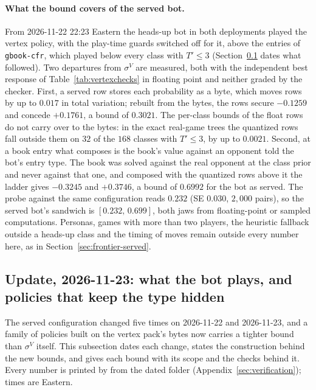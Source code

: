 \documentclass[11pt]{article}
\theoremstyle{plain}
\theoremstyle{definition}
\theoremstyle{remark}
\newcommand{\code}[1]{\texttt{\small #1}}
\begin{document}
\paragraph{What the bound covers of the served bot.} From 2026-11-22
22:23 Eastern the heads-up bot in both deployments played the vertex
policy, with the play-time guards switched off for it, above the
entries of \code{gbook-cfr}, which played below every class with
$T'\le3$ (Section~\ref{sec:split} dates what followed).
Two departures from $\sigma^{V}$ are measured, both with the
independent best response of Table~\ref{tab:vertexchecks} in floating
point and neither graded by the checker. First, a served row stores
each probability as a byte, which moves rows by up to $0.017$ in total
variation; rebuilt from the bytes, the rows secure $-0.1259$ and
concede $+0.1761$, a bound of $0.3021$. The per-class bounds of the
float rows do not carry over to the bytes: in the exact real-game
trees the quantized rows fall outside them on $32$ of the $168$ classes
with $T'\le3$, by up to $0.0021$. Second, at a book entry what composes
is the book's value against an opponent told the bot's entry type.
The book was solved against the real opponent at the class prior and
never against that one, and composed with the quantized rows above it
the ladder gives $-0.3245$ and $+0.3746$, a bound of $0.6992$ for the
bot as served. The probe against the same configuration reads
$0.232$ (SE $0.030$, $2{,}000$ pairs), so the served bot's sandwich is
$[0.232,\,0.699]$, both jaws from floating-point or sampled
computations. Personas, games with more than two players, the
heuristic fallback outside a heads-up class and the timing of moves
remain outside every number here, as in
Section~\ref{sec:frontier-served}.

\subsection{Update, 2026-11-23: what the bot plays, and policies that
keep the type hidden}\label{sec:split}

The served configuration changed five times on 2026-11-22 and
2026-11-23, and a family of policies built on the vertex pack's bytes
now carries a tighter bound than $\sigma^{V}$ itself. This subsection
dates each change, states the construction behind the new bounds, and
gives each bound with its scope and the checks behind it. Every number
is printed by  from the
dated folder 
(Appendix~\ref{sec:verification}); times are Eastern.
\end{document}
